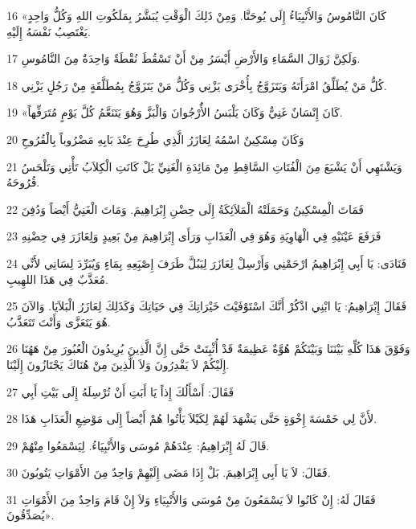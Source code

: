 \par 16 «كَانَ النَّامُوسُ وَالأَنْبِيَاءُ إِلَى يُوحَنَّا. وَمِنْ ذَلِكَ الْوَقْتِ يُبَشَّرُ بِمَلَكُوتِ اللهِ وَكُلُّ وَاحِدٍ يَغْتَصِبُ نَفْسَهُ إِلَيْهِ.
\par 17 وَلَكِنَّ زَوَالَ السَّمَاءِ وَالأَرْضِ أَيْسَرُ مِنْ أَنْ تَسْقُطَ نُقْطَةٌ وَاحِدَةٌ مِنَ النَّامُوسِ.
\par 18 كُلُّ مَنْ يُطَلِّقُ امْرَأَتَهُ وَيَتَزَوَّجُ بِأُخْرَى يَزْنِي وَكُلُّ مَنْ يَتَزَوَّجُ بِمُطَلَّقَةٍ مِنْ رَجُلٍ يَزْنِي.
\par 19 «كَانَ إِنْسَانٌ غَنِيٌّ وَكَانَ يَلْبَسُ الأَُرْجُوانَ وَالْبَزَّ وَهُوَ يَتَنَعَّمُ كُلَّ يَوْمٍ مُتَرَفِّهاً.
\par 20 وَكَانَ مِسْكِينٌ اسْمُهُ لِعَازَرُ الَّذِي طُرِحَ عِنْدَ بَابِهِ مَضْرُوباً بِالْقُرُوحِ
\par 21 وَيَشْتَهِي أَنْ يَشْبَعَ مِنَ الْفُتَاتِ السَّاقِطِ مِنْ مَائِدَةِ الْغَنِيِّ بَلْ كَانَتِ الْكِلاَبُ تَأْتِي وَتَلْحَسُ قُرُوحَهُ.
\par 22 فَمَاتَ الْمِسْكِينُ وَحَمَلَتْهُ الْمَلاَئِكَةُ إِلَى حِضْنِ إِبْرَاهِيمَ. وَمَاتَ الْغَنِيُّ أَيْضاً وَدُفِنَ
\par 23 فَرَفَعَ عَيْنَيْهِ فِي الْهَاوِيَةِ وَهُوَ فِي الْعَذَابِ وَرَأَى إِبْرَاهِيمَ مِنْ بَعِيدٍ وَلِعَازَرَ فِي حِضْنِهِ
\par 24 فَنَادَى: يَا أَبِي إِبْرَاهِيمُ ارْحَمْنِي وَأَرْسِلْ لِعَازَرَ لِيَبُلَّ طَرَفَ إِصْبَِعِهِ بِمَاءٍ وَيُبَرِّدَ لِسَانِي لأَنِّي مُعَذَّبٌ فِي هَذَا اللهِيبِ.
\par 25 فَقَالَ إِبْرَاهِيمُ: يَا ابْنِي اذْكُرْ أَنَّكَ اسْتَوْفَيْتَ خَيْرَاتِكَ فِي حَيَاتِكَ وَكَذَلِكَ لِعَازَرُ الْبَلاَيَا. وَالآنَ هُوَ يَتَعَزَّى وَأَنْتَ تَتَعَذَّبُ.
\par 26 وَفَوْقَ هَذَا كُلِّهِ بَيْنَنَا وَبَيْنَكُمْ هُوَّةٌ عَظِيمَةٌ قَدْ أُثْبِتَتْ حَتَّى إِنَّ الَّذِينَ يُرِيدُونَ الْعُبُورَ مِنْ هَهُنَا إِلَيْكُمْ لاَ يَقْدِرُونَ وَلاَ الَّذِينَ مِنْ هُنَاكَ يَجْتَازُونَ إِلَيْنَا.
\par 27 فَقَالَ: أَسْأَلُكَ إِذاً يَا أَبَتِ أَنْ تُرْسِلَهُ إِلَى بَيْتِ أَبِي
\par 28 لأَنَّ لِي خَمْسَةَ إِخْوَةٍ حَتَّى يَشْهَدَ لَهُمْ لِكَيْلاَ يَأْتُوا هُمْ أَيْضاً إِلَى مَوْضِعِ الْعَذَابِ هَذَا.
\par 29 قَالَ لَهُ إِبْرَاهِيمُ: عِنْدَهُمْ مُوسَى وَالأَنْبِيَاءُ. لِيَسْمَعُوا مِنْهُمْ.
\par 30 فَقَالَ: لاَ يَا أَبِي إِبْرَاهِيمَ. بَلْ إِذَا مَضَى إِلَيْهِمْ وَاحِدٌ مِنَ الأَمْوَاتِ يَتُوبُونَ.
\par 31 فَقَالَ لَهُ: إِنْ كَانُوا لاَ يَسْمَعُونَ مِنْ مُوسَى وَالأَنْبِيَاءِ وَلاَ إِنْ قَامَ وَاحِدٌ مِنَ الأَمْوَاتِ يُصَدِّقُونَ».

